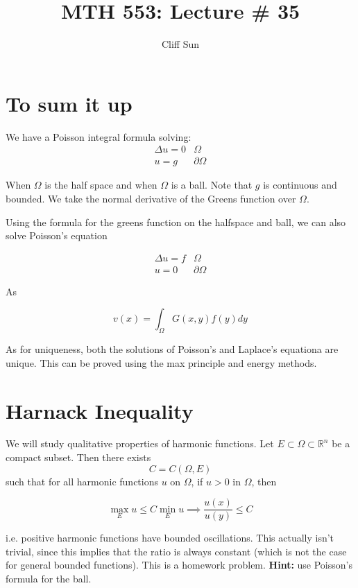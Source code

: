\documentclass{article}
\title{MTH 553: Lecture \# 35}
\author{Cliff Sun}
\newtheorem{one minute paper}[theorem]{One Minute Paper}
\begin{document}
\maketitle

\section*{To sum it up}
We have a Poisson integral formula solving:
\begin{align}
    \Delta u = 0 & \Omega \\
    u = g & \partial \Omega
\end{align}

When $\Omega$ is the half space and when $\Omega$ is a ball. Note that $g$ is continuous and bounded. We take the normal derivative of the Greens function over $\Omega$. 

Using the formula for the greens function on the halfspace and ball, we can also solve Poisson's equation 

\begin{align}
    \Delta u = f & \Omega \\
    u = 0 & \partial \Omega
\end{align}

As 

\begin{equation}
    v(x) = \int_{\Omega}G(x,y)f(y)dy
\end{equation}

As for uniqueness, both the solutions of Poisson's and Laplace's equationa are unique. This can be proved using the max principle and energy methods. 

\section*{Harnack Inequality}

We will study qualitative properties of harmonic functions. Let $E \subset \Omega \subset \mathbb{R}^n$ be a compact subset. Then there exists $$C = C(\Omega, E)$$ such that for all 
harmonic functions $u$ on $\Omega$, if $u > 0$ in $\Omega$, then 

\begin{equation}
    \max_E u \leq C\min_E u \implies \frac{u(x)}{u(y)} \leq C
\end{equation}

i.e. positive harmonic functions have bounded oscillations. 
This actually isn't trivial, since this implies that the ratio is always constant (which is not the case for general bounded functions). 
This is a homework problem. \textbf{Hint:} use Poisson's formula for the ball. 
\end{document}
